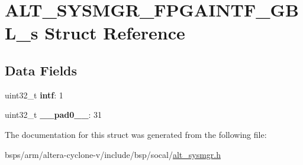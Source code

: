 \hypertarget{structALT__SYSMGR__FPGAINTF__GBL__s}{}\section{A\+L\+T\+\_\+\+S\+Y\+S\+M\+G\+R\+\_\+\+F\+P\+G\+A\+I\+N\+T\+F\+\_\+\+G\+B\+L\+\_\+s Struct Reference}
\label{structALT__SYSMGR__FPGAINTF__GBL__s}
\subsection*{Data Fields}
\begin{DoxyCompactItemize}
\item 
\mbox{\label{structALT__SYSMGR__FPGAINTF__GBL__s_adef1419eb523cb304cee9f82697738ea}} 
uint32\+\_\+t {\bfseries intf}\+: 1
\item 
\mbox{\label{structALT__SYSMGR__FPGAINTF__GBL__s_a985b04c9ee100f9f53f410db9a67356a}} 
uint32\+\_\+t {\bfseries \+\_\+\+\_\+pad0\+\_\+\+\_\+}\+: 31
\end{DoxyCompactItemize}


The documentation for this struct was generated from the following file\+:\begin{DoxyCompactItemize}
\item 
bsps/arm/altera-\/cyclone-\/v/include/bsp/socal/\mbox{\hyperlink{alt__sysmgr_8h}{alt\+\_\+sysmgr.\+h}}\end{DoxyCompactItemize}
